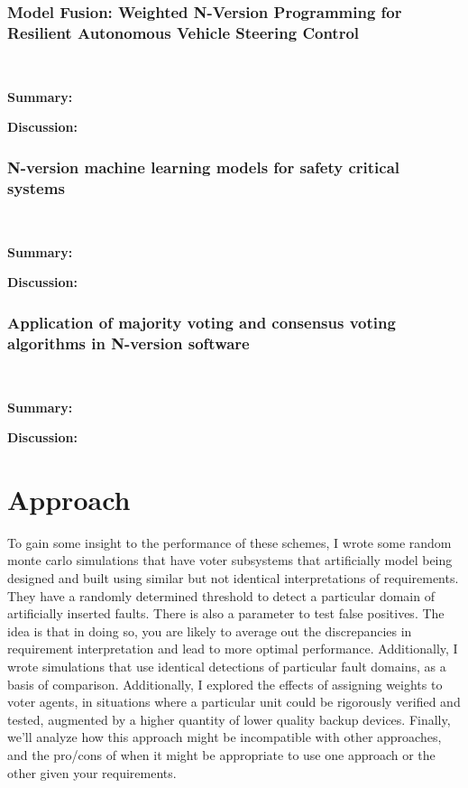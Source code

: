 \documentclass[article]{IEEEtran}
\begin{document}
\subsubsection{Model Fusion: Weighted N-Version Programming for Resilient Autonomous Vehicle Steering Control}
\cite{wuetal}
\hfill\\
\par
\textbf{Summary:} 
\par
\textbf{Discussion:}

\subsubsection{N-version machine learning models for safety critical systems}
\cite{machida2019n}
\hfill\\
\par
\textbf{Summary:} 
\par
\textbf{Discussion:}

\subsubsection{Application of majority voting and consensus voting algorithms in N-version software}
\cite{Tsarev_2018}
\hfill\\
\par
\textbf{Summary:} 
\par
\textbf{Discussion:}

\section{Approach}
To gain some insight to the performance of these schemes, I wrote some random monte carlo simulations that have voter subsystems that artificially model being designed and built using similar but not identical interpretations of requirements. They have a randomly determined threshold to detect a particular domain of artificially inserted faults. There is also a parameter to test false positives. The idea is that in doing so, you are likely to average out the discrepancies in requirement interpretation and lead to more optimal performance. Additionally, I wrote simulations that use identical detections of particular fault domains, as a basis of comparison.  Additionally, I explored the effects of assigning weights to voter agents, in situations where a particular unit could be rigorously verified and tested, augmented by a higher quantity of lower quality backup devices. Finally, we'll analyze how this approach might be incompatible with other approaches, and the pro/cons of when it might be appropriate to use one approach or the other given your requirements. 
\end{document}
